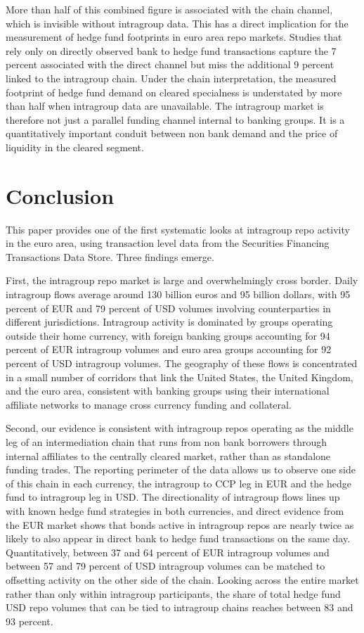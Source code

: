 \documentclass[english, 11pt, oneside, legal]{article}
\begin{document}
More than half of this combined figure is associated with the chain channel, which is invisible without intragroup data. This has a direct implication for the measurement of hedge fund footprints in euro area repo markets. Studies that rely only on directly observed bank to hedge fund transactions capture the 7 percent associated with the direct channel but miss the additional 9 percent linked to the intragroup chain. Under the chain interpretation, the measured footprint of hedge fund demand on cleared specialness is understated by more than half when intragroup data are unavailable. The intragroup market is therefore not just a parallel funding channel internal to banking groups. It is a quantitatively important conduit between non bank demand and the price of liquidity in the cleared segment.




\section{Conclusion}
\label{sec:conclusion}

This paper provides one of the first systematic looks at intragroup repo activity in the euro area, using transaction level data from the Securities Financing Transactions Data Store. Three findings emerge.

First, the intragroup repo market is large and overwhelmingly cross border. Daily intragroup flows average around 130 billion euros and 95 billion dollars, with 95 percent of EUR and 79 percent of USD volumes involving counterparties in different jurisdictions. Intragroup activity is dominated by groups operating outside their home currency, with foreign banking groups accounting for 94 percent of EUR intragroup volumes and euro area groups accounting for 92 percent of USD intragroup volumes. The geography of these flows is concentrated in a small number of corridors that link the United States, the United Kingdom, and the euro area, consistent with banking groups using their international affiliate networks to manage cross currency funding and collateral.

Second, our evidence is consistent with intragroup repos operating as the middle leg of an intermediation chain that runs from non bank borrowers through internal affiliates to the centrally cleared market, rather than as standalone funding trades. The reporting perimeter of the data allows us to observe one side of this chain in each currency, the intragroup to CCP leg in EUR and the hedge fund to intragroup leg in USD. The directionality of intragroup flows lines up with known hedge fund strategies in both currencies, and direct evidence from the EUR market shows that bonds active in intragroup repos are nearly twice as likely to also appear in direct bank to hedge fund transactions on the same day. Quantitatively, between 37 and 64 percent of EUR intragroup volumes and between 57 and 79 percent of USD intragroup volumes can be matched to offsetting activity on the other side of the chain. Looking across the entire market rather than only within intragroup participants, the share of total hedge fund USD repo volumes that can be tied to intragroup chains reaches between 83 and 93 percent.
\end{document}
